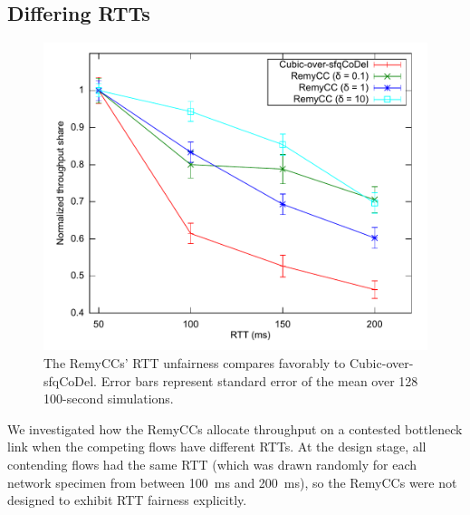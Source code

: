 %
%


%

\subsection{Differing RTTs}

\begin{figure}

\includegraphics[width=\columnwidth]{rttfairness.pdf}
\caption{The RemyCCs' RTT unfairness compares favorably to
  Cubic-over-sfqCoDel. Error bars represent standard error of the mean
  over 128 100-second simulations.}

\label{f:fairness}

\end{figure}

We investigated how the RemyCCs allocate throughput on a contested
bottleneck link when the competing flows have different RTTs. At the
design stage, all contending flows had the same RTT (which was drawn
randomly for each network specimen from between 100~ms and 200~ms), so
the RemyCCs were not designed to exhibit RTT fairness explicitly.

